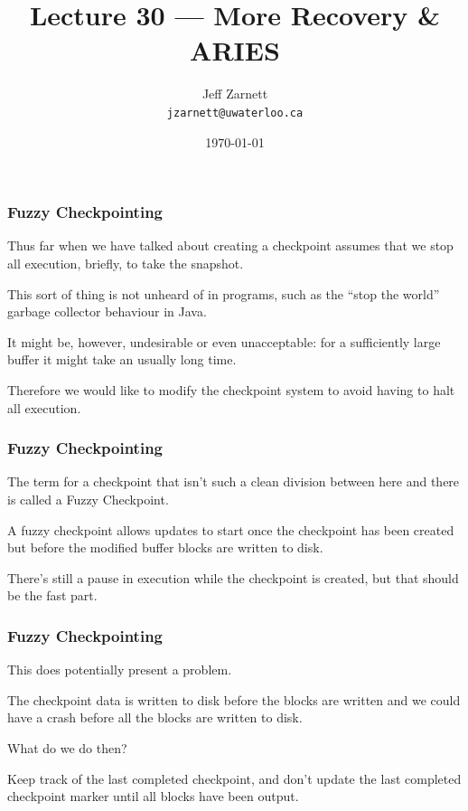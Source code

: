 

\title{Lecture 30 --- More Recovery \& ARIES }

\author{Jeff Zarnett \\ \small \texttt{jzarnett@uwaterloo.ca}}
\date{\today}




\begin{frame}
  \titlepage

 \end{frame}


\begin{frame}
\frametitle{Fuzzy Checkpointing}

Thus far when we have talked about creating a checkpoint assumes that we stop all execution, briefly, to take the snapshot. 

This sort of thing is not unheard of in programs, such as the ``stop the world'' garbage collector behaviour in Java. 

It might be, however, undesirable or even unacceptable: for a sufficiently large buffer it might take an usually long time. 

Therefore we would like to modify the checkpoint system to avoid having to halt all execution.


\end{frame}

\begin{frame}
\frametitle{Fuzzy Checkpointing}

The term for a checkpoint that isn't such a clean division between here and there is called a \alert{Fuzzy Checkpoint}. 

A fuzzy checkpoint allows updates to start once the checkpoint has been created but before the modified buffer blocks are written to disk. 

There's still a pause in execution while the checkpoint is created, but that should be the fast part.


\end{frame}

\begin{frame}
\frametitle{Fuzzy Checkpointing}

This does potentially present a problem. 

The checkpoint data is written to disk before the blocks are written and we could have a crash before all the blocks are written to disk. 

What do we do then? 

Keep track of the last completed checkpoint, and don't update the last completed checkpoint marker until all blocks have been output.

\end{frame}

